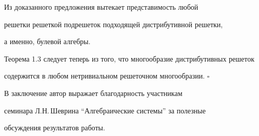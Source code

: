 Из доказанного предложения вытекает представимость любой


решетки решеткой подрешеток подходящей дистрибутивной решетки,


а именно, булевой алгебры.


Теорема 1.3 следует теперь из того, что многообразие дистрибутивных решеток


содержится в любом нетривиальном решеточном многообразии. $\square$





В заключение автор выражает благодарность участникам


семинара Л.Н.\,Шеврина ``Алгебраические системы'' за полезные


обсуждения результатов работы.






